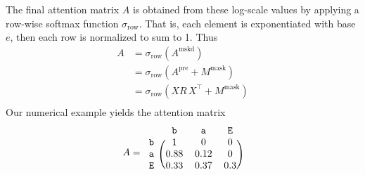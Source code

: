 \documentclass{article}
\newcommand{\ta}{\mathtt{a}}
\newcommand{\tb}{\mathtt{b}}
\newcommand{\tE}{\mathtt{E}}
\newcommand{\Tr}{^{\top}} %
\begin{document}
The final attention matrix $A$ is obtained from these log-scale values
by applying a row-wise softmax function $\sigma_\text{row}$. That is,
each element is exponentiated with base $e$, then each row is
normalized to sum to 1. Thus
\begin{displaymath}
\begin{aligned}
  A &= \sigma_\text{row}(A^\text{mskd}) \\
    &= \sigma_\text{row}(A^\text{pre} + M^\text{mask}) \\
    &= \sigma_\text{row}(X R\, X\Tr + M^\text{mask}) \\
\end{aligned}
\end{displaymath}
Our numerical example yields the attention matrix
\begin{displaymath}
  A =
  \begin{blockarray}{cccc}
       & \tb & \ta & \tE   \\
      \begin{block}{c(ccc)}
        \tb & 1 & 0 & 0  \\
        \ta & 0.88 & 0.12 & 0  \\
        \tE & 0.33 & 0.37 & 0.3  \\
      \end{block}
  \end{blockarray}
\end{displaymath}
\end{document}
